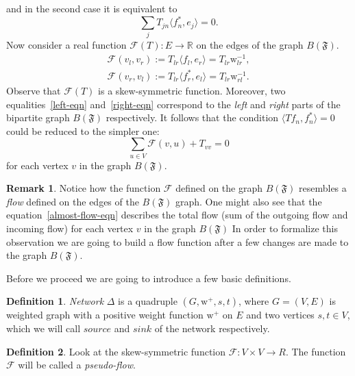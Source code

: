 \documentclass[12pt]{article}
\newcommand\inner[2]{\langle #1, #2 \rangle}
\theoremstyle{definition}
\newtheorem{remark}{Remark}
\newtheorem{definition}{Definition}
\newcommand{\fsys}{\mathfrak{F}}
\newcommand{\wt}{\mathrm{w}}
\newcommand{\wtp}{\mathrm{w}^{+}}
\newcommand{\flow}{\mathcal{F}}
\newcommand{\flowsgn}{\flow}
\newcommand{\source}{\mathit{source}}
\newcommand{\sink}{\mathit{sink}}
\newcommand{\net}{\Delta}
\numberwithin{remark}{section}
\numberwithin{theorem}{section}
\numberwithin{prop}{section}
\numberwithin{equation}{section}
\numberwithin{lemma}{section}
\numberwithin{prop_under_lemma}{lemma}
\begin{document}
    and in the second case it is equivalent to 
    \begin{equation}
        \label{right-eqn}
        \sum_j T_{jn} \inner{f^*_n}{e_j} = 0.
    \end{equation}
    Now consider a real function $\flowsgn(T): E \to \mathbb{R}$ 
    on the edges of the graph $B(\fsys)$.
    \begin{align*}
        \flowsgn(v_l, v_r) := T_{lr} \inner{f_l}{e_r} = T_{lr} \wt_{lr}^{-1},\\
        \flowsgn(v_r, v_l) := T_{lr} \inner{f^*_r}{e_l} = T_{lr} \wt_{rl}^{-1}.
    \end{align*}
    Observe that $\flowsgn(T)$ is a skew-symmetric function.
    Moreover, two equalities~\eqref{left-eqn} and~\eqref{right-eqn} correspond to the \textit{left} and \textit{right}
      parts of the bipartite graph $B(\fsys)$ respectively.
    It follows that the condition $\inner{Tf_n}{f_n^*} = 0$ could be reduced to the simpler one:
    \begin{equation}
      \label{almost-flow-eqn}
      \sum_{u \in V} \flowsgn(v, u) + T_{vv} = 0
    \end{equation}
      for each vertex $v$ in the graph $B(\fsys)$.
    \begin{remark}
      Notice how the function $\flow$ defined on the graph $B(\fsys)$ resembles
      a \emph{flow} defined on the edges of the $B(\fsys)$ graph.
      One might also see that the equation~\eqref{almost-flow-eqn} describes the total flow (sum of the outgoing flow and incoming flow) 
      for each vertex $v$ in the graph $B(\fsys)$
      In order to formalize this observation we are going to build a flow function
      after a few changes are made to the graph $B(\fsys)$.
    \end{remark}
    Before we proceed we are going to introduce a few basic definitions.
    \begin{definition}
        \emph{Network} $\net$ is a quadruple $(G, \wtp, s, t)$, where $G = (V, E)$ is weighted graph 
        with a positive weight function $\wtp$ on $E$ and two vertices $s, t \in V$, which
        we will call $\source$ and $\sink$ of the network respectively.
    \end{definition}
    \begin{definition}
        Look at the skew-symmetric function $\flow: V \times V \to R$.
        The function $\flow$ will be called a \emph{pseudo-flow}.
    \end{definition}
\end{document}
